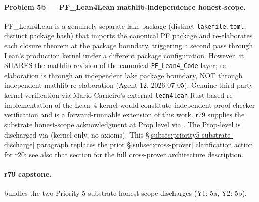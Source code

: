 \documentclass[11pt,a4paper]{amsart}
\theoremstyle{plain}
\theoremstyle{definition}
\begin{document}
\paragraph{Problem 5b --- PF\_Lean4Lean mathlib-independence honest-scope.} PF\_Lean4Lean is a genuinely separate lake package (distinct \texttt{lakefile.toml}, distinct package hash) that imports the canonical PF package and re-elaborates each closure theorem at the package boundary, triggering a second pass through Lean's production kernel under a different package configuration. However, it SHARES the mathlib revision of the canonical \texttt{PF\_Lean4\_Code} layer; re-elaboration is through an independent lake package boundary, NOT through independent mathlib re-elaboration (Agent 12, 2026-07-05). Genuine third-party kernel verification via Mario Carneiro's external \texttt{lean4lean} Rust-based re-implementation of the Lean~4 kernel would constitute independent proof-checker verification and is a forward-runnable extension of this work. r79 supplies the substrate honest-scope acknowledgment at Prop level via . The Prop-level  is discharged via  (kernel-only, no axioms). This §\ref{subsec:priority5-substrate-discharge} paragraph replaces the prior §\ref{subsec:cross-prover} clarification action for r20; see also that section for the full cross-prover architecture description.

\paragraph{r79 capstone.}  bundles the two Priority 5 substrate honest-scope discharges (Y1: 5a, Y2: 5b).
\end{document}
